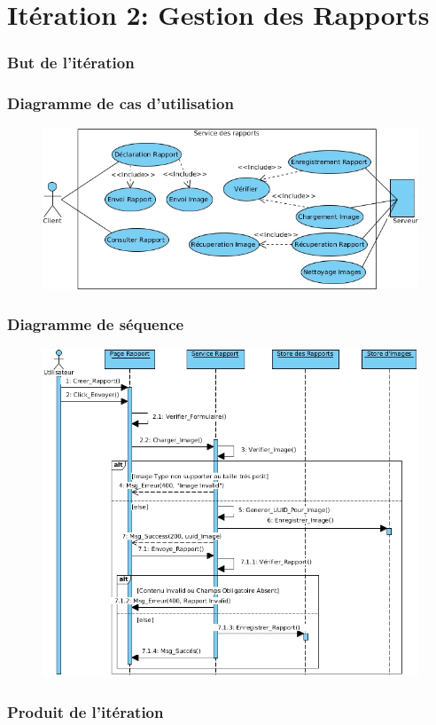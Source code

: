 \documentclass{beamer}
\begin{document}
\section{Itération 2: Gestion des Rapports}
\begin{frame}
    \frametitle{But de l'itération}
\end{frame}
\begin{frame}
    \frametitle{Diagramme de cas d'utilisation}
    \begin{figure}
        \includegraphics[width=\textwidth]{./diagrams/sprint2-webservices-report-usecase}
    \end{figure}
\end{frame}
\begin{frame}
    \frametitle{Diagramme de séquence}
    \begin{figure}
        \includegraphics[width=.8\textwidth]{./diagrams/sprint2-webservices-report-post-sequence}
    \end{figure}
\end{frame}
\begin{frame}
    \frametitle{Produit de l'itération}
\end{frame}
\end{document}
